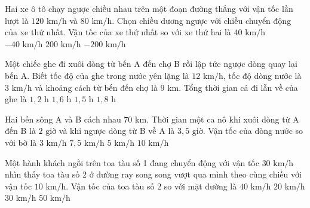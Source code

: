 \begin{ex}
Hai xe ô tô chạy ngược chiều nhau trên một đoạn đường thẳng với vận tốc lần lượt là $120\text{ km/h}$ và $80\text{ km/h}$. Chọn chiều dương ngược với chiều chuyển động của xe thứ nhất. Vận tốc của xe thứ nhất so với xe thứ hai là
\choice
{$40\text{ km/h}$}
{$-40\text{ km/h}$}
{$200\text{ km/h}$}
{\True $-200\text{ km/h}$}
\end{ex}

\begin{ex}
Một chiếc ghe đi xuôi dòng từ bến A đến chợ B rồi lập tức ngược dòng quay lại bến A. Biết tốc độ của ghe trong nước yên lặng là $12\text{ km/h}$, tốc độ dòng nước là $3\text{ km/h}$ và khoảng cách từ bến đến chợ là $9\text{ km}$. Tổng thời gian cả đi lẫn về của ghe là
\choice
{$1{,}2\text{ h}$}
{\True $1{,}6\text{ h}$}
{$1{,}5\text{ h}$}
{$1{,}8\text{ h}$}
\end{ex}

\begin{ex}
Hai bến sông A và B cách nhau $70\text{ km}$. Thời gian một ca nô khi xuôi dòng từ A đến B là $2\text{ giờ}$ và khi ngược dòng từ B về A là $3{,}5\text{ giờ}$. Vận tốc của dòng nước so với bờ là
\choice
{$3\text{ km/h}$}
{\True $7{,}5\text{ km/h}$}
{$5\text{ km/h}$}
{$10\text{ km/h}$}
\end{ex}

\begin{ex}
Một hành khách ngồi trên toa tàu số 1 đang chuyển động với vận tốc $30\text{ km/h}$ nhìn thấy toa tàu số 2 ở đường ray song song vượt qua mình theo cùng chiều với vận tốc $10\text{ km/h}$. Vận tốc của toa tàu số 2 so với mặt đường là
\choice
{\True $40\text{ km/h}$}
{$20\text{ km/h}$}
{$30\text{ km/h}$}
{$50\text{ km/h}$}
\end{ex}

